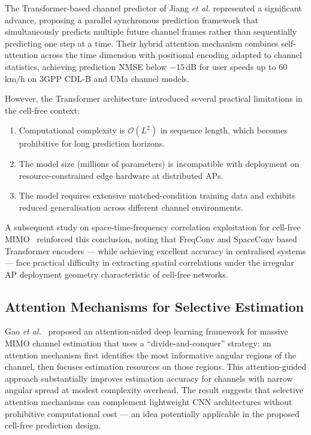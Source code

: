 \documentclass[12pt,a4paper]{article}
\begin{document}
The Transformer-based channel predictor of Jiang \textit{et al.}
\cite{Jiang2022transformer} represented a significant advance,
proposing a parallel synchronous prediction framework that simultaneously
predicts multiple future channel frames rather than sequentially
predicting one step at a time. Their hybrid attention mechanism combines
self-attention across the time dimension with positional encoding
adapted to channel statistics, achieving prediction NMSE below
$-15$\,dB for user speeds up to 60\,km/h on 3GPP CDL-B and UMa
channel models.

However, the Transformer architecture introduced several practical
limitations in the cell-free context:
\begin{enumerate}[nosep]
  \item Computational complexity is $\mathcal{O}(L^2)$ in sequence
        length, which becomes prohibitive for long prediction horizons.
  \item The model size (millions of parameters) is incompatible with
        deployment on resource-constrained edge hardware at distributed APs.
  \item The model requires extensive matched-condition training data
        and exhibits reduced generalisation across different channel
        environments.
\end{enumerate}

A subsequent study on space-time-frequency correlation exploitation
for cell-free MIMO~\cite{Ko2022wideband} reinforced this conclusion,
noting that FreqConv and SpaceConv based Transformer encoders --- while
achieving excellent accuracy in centralised systems --- face practical
difficulty in extracting spatial correlations under the irregular AP
deployment geometry characteristic of cell-free networks.

\subsection{Attention Mechanisms for Selective Estimation}

Gao \textit{et al.}~\cite{Gao2021attention} proposed an attention-aided
deep learning framework for massive MIMO channel estimation that uses a
``divide-and-conquer'' strategy: an attention mechanism first identifies
the most informative angular regions of the channel, then focuses
estimation resources on those regions. This attention-guided approach
substantially improves estimation accuracy for channels with narrow
angular spread at modest complexity overhead. The result suggests that
selective attention mechanisms can complement lightweight CNN
architectures without prohibitive computational cost --- an idea
potentially applicable in the proposed cell-free prediction design.
\end{document}
